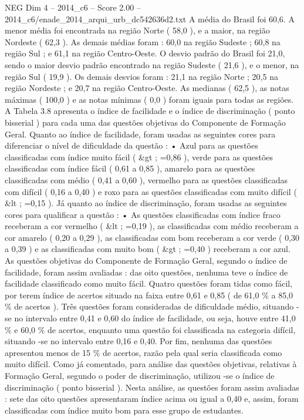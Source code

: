 \begin{textsample}{NEG Dim 4 – 2014\_c6 – Score 2.00 – 2014\_c6/enade\_2014\_arqui\_urb\_dc542636d2.txt}
A média do Brasil foi 60,6.
A menor média foi encontrada na região Norte ( 58,0 ), e a maior, na região Nordeste ( 62,3 ).
As demais médias foram : 60,0 na região Sudeste ; 60,8 na região Sul ; e 61,1 na região Centro-Oeste.
O desvio padrão do Brasil foi 21,0, sendo o maior desvio padrão encontrado na região Sudeste ( 21,6 ), e o menor, na região Sul ( 19,9 ).
Os demais desvios foram : 21,1 na região Norte ; 20,5 na região Nordeste ; e 20,7 na região Centro-Oeste.
As medianas ( 62,5 ), as notas máximas ( 100,0 ) e as notas mínimas ( 0,0 ) foram iguais para todas as regiões.
A Tabela 3.8 apresenta o índice de facilidade e o índice de discriminação ( ponto bisserial ) para cada uma das questões objetivas do Componente de Formação Geral.
Quanto ao índice de facilidade, foram usadas as seguintes cores para diferenciar o nível de dificuldade da questão : • Azul para as questões classificadas com índice muito fácil ( \&gt ; =0,86 ), verde para as questões classificadas com índice fácil ( 0,61 a 0,85 ), amarelo para as questões classificadas com médio ( 0,41 a 0,60 ), vermelho para as questões classificadas com difícil ( 0,16 a 0,40 ) e roxo para as questões classificadas com muito difícil ( \&lt ; =0,15 ).
Já quanto ao índice de discriminação, foram usadas as seguintes cores para qualificar a questão : • As questões classificadas com índice fraco receberam a cor vermelho ( \&lt ; =0,19 ), as classificadas com médio receberam a cor amarelo ( 0,20 a 0,29 ), as classificadas com bom receberam a cor verde ( 0,30 a 0,39 ) e as classificadas com muito bom ( \&gt ; =0,40 ) receberam a cor azul.
As questões objetivas do Componente de Formação Geral, segundo o índice de facilidade, foram assim avaliadas : das oito questões, nenhuma teve o índice de facilidade classificado como muito fácil.
Quatro questões foram tidas como fácil, por terem índice de acertos situado na faixa entre 0,61 e 0,85 ( de 61,0 \% a 85,0 \% de acertos ).
Três questões foram consideradas de dificuldade médio, situando -se no intervalo entre 0,41 e 0,60 do índice de facilidade, ou seja, houve entre 41,0 \% e 60,0 \% de acertos, enquanto uma questão foi classificada na categoria difícil, situando -se no intervalo entre 0,16 e 0,40.
Por fim, nenhuma das questões apresentou menos de 15 \% de acertos, razão pela qual seria classificada como muito difícil.
Como já comentado, para análise das questões objetivas, relativas à Formação Geral, segundo o poder de discriminação, utilizou -se o índice de discriminação ( ponto bisserial ).
Nesta análise, as questões foram assim avaliadas : sete das oito questões apresentaram índice acima ou igual a 0,40 e, assim, foram classificadas com índice muito bom para esse grupo de estudantes.

\end{textsample}

